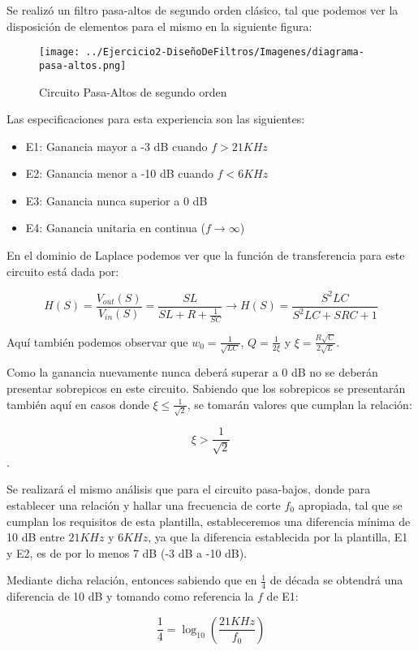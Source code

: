 Se realizó un filtro pasa-altos de segundo orden clásico, tal que podemos
ver la disposición de elementos para el mismo en la siguiente figura:

\begin{figure}[H]
    \centering
    \texttt{[image: ../Ejercicio2-DiseñoDeFiltros/Imagenes/diagrama-pasa-altos.png]}
    \caption{Circuito Pasa-Altos de segundo orden}
\end{figure}

Las especificaciones para esta experiencia son las siguientes:

\begin{itemize}
	\item E1: Ganancia mayor a -3 dB cuando $f > 21 KHz$ 
	\item E2: Ganancia menor a -10 dB cuando $f < 6 KHz $
	\item E3: Ganancia nunca superior a 0 dB
	\item E4: Ganancia unitaria en continua ($f \to \infty$)
\end{itemize}

En el dominio de Laplace podemos ver que la función de transferencia para este circuito está dada por:

$$H(S)=\frac{V_{out}(S)}{V_{in}(S)}=\frac{SL}{SL+R+\frac{1}{SC}} \longrightarrow H(S)=\frac{S^{2}LC}{S^2LC+SRC+1}$$

Aquí también podemos observar que $w_0=\frac{1}{\sqrt{LC}}$, $Q=\frac{1}{2\xi}$ y $\xi=\frac{R\sqrt{C}}{2\sqrt{L}}$.

Como la ganancia nuevamente nunca deberá superar a 0 dB no se deberán presentar sobrepicos en este circuito.
Sabiendo que los sobrepicos se presentarán también aquí en casos donde $\xi \leq \frac{1}{\sqrt{2}}$, se tomarán valores que cumplan la relación:

$$\xi > \frac{1}{\sqrt{2}}$$.

Se realizará el mismo análisis que para el circuito pasa-bajos, donde para establecer una relación y hallar una frecuencia de corte $f_0$ apropiada, tal que se cumplan los requisitos
de esta plantilla, estableceremos una diferencia mínima de 10 dB entre $21 KHz$ y $6 KHz$, ya que la diferencia establecida por la plantilla, E1 y E2,
es de por lo menos 7 dB (-3 dB a -10 dB).

Mediante dicha relación, entonces sabiendo que en $\frac{1}{4}$ de década se obtendrá una diferencia de 10 dB y tomando como referencia 
la $f$ de E1:

$$\frac{1}{4}=\log_{10}(\frac{21KHz}{f_0})$$

